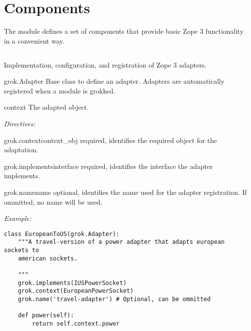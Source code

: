 \chapter{Components}

The  module defines a set of components that provide basic Zope 3
functionality in a convenient way.

\section{}
\label{grok-adapter}

    Implementation, configuration, and registration of Zope 3 adapters.

    \begin{classdesc*}{grok.Adapter}
        Base class to define an adapter. Adapters are automatically registered
        when a module is grokked.

        \begin{memberdesc}{context}
            The adapted object.
        \end{memberdesc}

        \emph{Directives:}

        \begin{methoddesc}{grok.context}{context_obj}
            required, identifies the required object for the
            adaptation.
        \end{methoddesc}

        \begin{methoddesc}{grok.implements}{interface}
            required, identifies the interface the adapter implements.
        \end{methoddesc}

        \begin{methoddesc}{grok.name}{name}
            optional, identifies the name used for the adapter
            registration. If ommitted, no name will be used.
        \end{methoddesc}

    \end{classdesc*}

    \emph{Example:}
    \begin{verbatim}
class EuropeanToUS(grok.Adapter):
    """A travel-version of a power adapter that adapts european sockets to
    american sockets.

    """
    grok.implements(IUSPowerSocket)
    grok.context(EuropeanPowerSocket)
    grok.name('travel-adapter') # Optional, can be ommitted

    def power(self):
        return self.context.power
    \end{verbatim}

